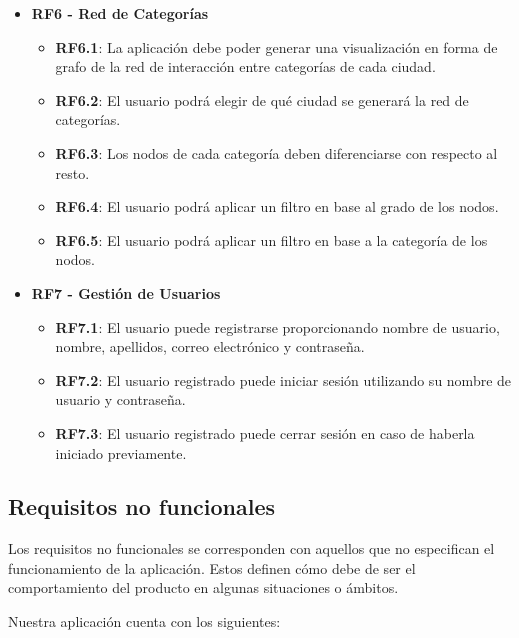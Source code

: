 \begin{itemize}
	\item \textbf{RF6 - Red de Categorías}
	\begin{itemize}
		\item \textbf{RF6.1}: La aplicación debe poder generar una visualización en forma de grafo de la red de interacción entre categorías de cada ciudad.
		\item \textbf{RF6.2}: El usuario podrá elegir de qué ciudad se generará la red de categorías.
		\item \textbf{RF6.3}: Los nodos de cada categoría deben diferenciarse con respecto al resto.
		\item \textbf{RF6.4}: El usuario podrá aplicar un filtro en base al grado de los nodos.
		\item \textbf{RF6.5}: El usuario podrá aplicar un filtro en base a la categoría de los nodos.
	\end{itemize}
	
	\item \textbf{RF7 - Gestión de Usuarios}
	\begin{itemize}
		\item \textbf{RF7.1}: El usuario puede registrarse proporcionando nombre de usuario, nombre, apellidos, correo electrónico y contraseña.
		\item \textbf{RF7.2}: El usuario registrado puede iniciar sesión utilizando su nombre de usuario y contraseña.
		\item \textbf{RF7.3}: El usuario registrado puede cerrar sesión en caso de haberla iniciado previamente.
	\end{itemize}
	
\end{itemize}

\subsection{Requisitos no funcionales}
Los requisitos no funcionales se corresponden con aquellos que no especifican el funcionamiento de la aplicación. Estos definen cómo debe de ser el comportamiento del producto en algunas situaciones o ámbitos.

Nuestra aplicación cuenta con los siguientes:


